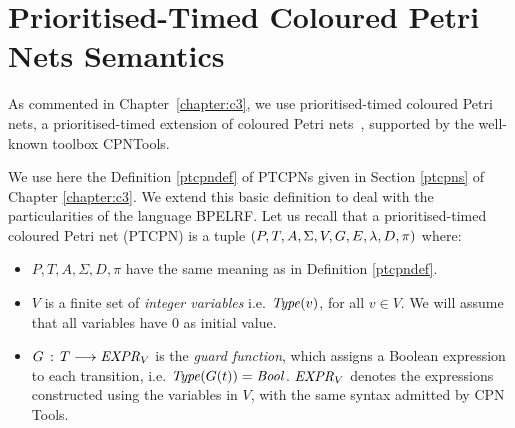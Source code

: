 \section*{Prioritised-Timed Coloured Petri Nets Semantics}
As commented in Chapter~\ref{chapter:c3}, we use prioritised-timed coloured Petri nets, 
a prioritised-timed extension of coloured Petri nets~\cite{Jensen2009},
supported by the well-known toolbox CPNTools\cite{CPNTools}.

\begin{definition} 
We use here the Definition \ref{ptcpndef} of PTCPNs given in Section \ref{ptcpns} of Chapter \ref{chapter:c3}. 
We extend this basic definition to deal with the particularities of the language BPELRF. Let us recall 
that a prioritised-timed coloured Petri net (PTCPN) is a tuple $(P,T,A,\Sigma,V,G,E,\lambda,D,\pi)$ where:

\begin{itemize}
\item $P, T, A, \Sigma, D, \pi$ have the same meaning as in Definition \ref{ptcpndef}.
\item $V$ is a finite set of {\em integer variables}
i.e. ${\it Type}(v)$, for all $v \in V$.
We will assume that all variables have $0$ as initial value.
%
%
\item $G\,:\, T \longrightarrow {\it EXPR}_V$ is the
{\em guard function}, which assigns a Boolean
expression to each transition, i.e. ${\it Type}(G(t))={\it Bool}$.
${\it EXPR}_V$ denotes the
expressions constructed using the variables in $V$,
with the same syntax admitted by CPN Tools.
%


\end{itemize}
\end{definition}
